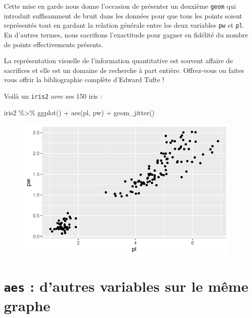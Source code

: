 \documentclass[
  letterpaper,
  DIV=11,
  numbers=noendperiod]{scrreprt}
\newenvironment{Shaded}{\begin{snugshade}}{\end{snugshade}}
\newcommand{\FunctionTok}[1]{\textcolor[rgb]{0.28,0.35,0.67}{#1}}
\newcommand{\NormalTok}[1]{\textcolor[rgb]{0.00,0.23,0.31}{#1}}
\newcommand{\SpecialCharTok}[1]{\textcolor[rgb]{0.37,0.37,0.37}{#1}}
\begin{document}
Cette mise en garde nous donne l'occasion de présenter un deuxième
\texttt{geom} qui introduit suffisamment de bruit dans les données pour
que tous les points soient représentés tout en gardant la relation
générale entre les deux variables \texttt{pw} et \texttt{pl}. En
d'autres termes, nous sacrifions l'exactitude pour gagner en fidélité du
nombre de points effectivements présents.

La représentation visuelle de l'information quantitative est souvent
affaire de sacrifices et elle est un domaine de recherche à part
entière. Offrez-vous ou faites vous offrir la bibliographie complète
d'Edward Tufte !

Voilà un \texttt{iris2} avec ses 150 iris :

\begin{Shaded}
\begin{Highlighting}[]
\NormalTok{iris2 }\SpecialCharTok{\%\textgreater{}\%} 
  \FunctionTok{ggplot}\NormalTok{() }\SpecialCharTok{+} 
  \FunctionTok{aes}\NormalTok{(pl, pw) }\SpecialCharTok{+} 
  \FunctionTok{geom\_jitter}\NormalTok{()}
\end{Highlighting}
\end{Shaded}

\begin{figure}[H]

{\centering \includegraphics{ggplot2_files/figure-pdf/unnamed-chunk-4-1.pdf}

}

\end{figure}

\hypertarget{aes-dautres-variables-sur-le-muxeame-graphe}{%
\section{\texorpdfstring{\texttt{aes} : d'autres variables sur le même
graphe}{aes : d'autres variables sur le même graphe}}\label{aes-dautres-variables-sur-le-muxeame-graphe}}
\end{document}
